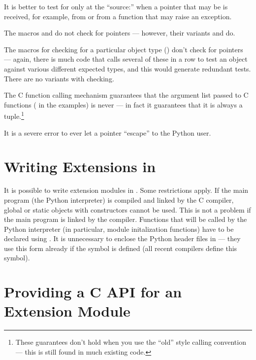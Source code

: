It is better to test for \NULL{} only at the ``source:'' when a
pointer that may be \NULL{} is received, for example, from
 or from a function that may raise an exception.

The macros  and 
do not check for \NULL{} pointers --- however, their variants
 and  do.

The macros for checking for a particular object type
() don't check for \NULL{} pointers ---
again, there is much code that calls several of these in a row to test
an object against various different expected types, and this would
generate redundant tests.  There are no variants with \NULL{}
checking.

The C function calling mechanism guarantees that the argument list
passed to C functions ( in the examples) is never
\NULL{} --- in fact it guarantees that it is always a tuple.\footnote{
These guarantees don't hold when you use the ``old'' style
calling convention --- this is still found in much existing code.}

It is a severe error to ever let a \NULL{} pointer ``escape'' to
the Python user.



\section{Writing Extensions in \Cpp
         \label{cplusplus}}

It is possible to write extension modules in \Cpp.  Some restrictions
apply.  If the main program (the Python interpreter) is compiled and
linked by the C compiler, global or static objects with constructors
cannot be used.  This is not a problem if the main program is linked
by the \Cpp{} compiler.  Functions that will be called by the
Python interpreter (in particular, module initalization functions)
have to be declared using .
It is unnecessary to enclose the Python header files in
 --- they use this form already if the symbol
 is defined (all recent \Cpp{} compilers define this
symbol).


\section{Providing a C API for an Extension Module
         \label{using-cobjects}}


